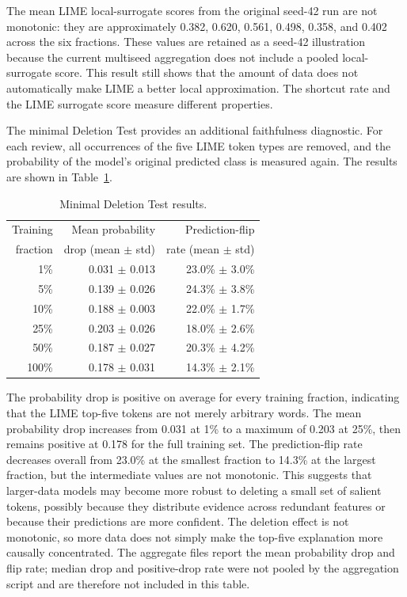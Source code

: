 \documentclass[11pt]{article}
\begin{document}
The mean LIME local-surrogate scores from the original seed-42 run are not monotonic: they are approximately 0.382, 0.620, 0.561, 0.498, 0.358, and 0.402 across the six fractions. These values are retained as a seed-42 illustration because the current multiseed aggregation does not include a pooled local-surrogate score. This result still shows that the amount of data does not automatically make LIME a better local approximation. The shortcut rate and the LIME surrogate score measure different properties.

The minimal Deletion Test provides an additional faithfulness diagnostic. For each review, all occurrences of the five LIME token types are removed, and the probability of the model's original predicted class is measured again. The results are shown in Table~\ref{tab:deletion-results}.

\begin{table}[htbp]
\centering
\small
\caption{Minimal Deletion Test results.}
\label{tab:deletion-results}
\begin{tabular}{rrr}
\toprule
Training & Mean probability & Prediction-flip \\
fraction & drop (mean $\pm$ std) & rate (mean $\pm$ std) \\
\midrule
1\% & 0.031 $\pm$ 0.013 & 23.0\% $\pm$ 3.0\% \\
5\% & 0.139 $\pm$ 0.026 & 24.3\% $\pm$ 3.8\% \\
10\% & 0.188 $\pm$ 0.003 & 22.0\% $\pm$ 1.7\% \\
25\% & 0.203 $\pm$ 0.026 & 18.0\% $\pm$ 2.6\% \\
50\% & 0.187 $\pm$ 0.027 & 20.3\% $\pm$ 4.2\% \\
100\% & 0.178 $\pm$ 0.031 & 14.3\% $\pm$ 2.1\% \\
\bottomrule
\end{tabular}
\end{table}

The probability drop is positive on average for every training fraction, indicating that the LIME top-five tokens are not merely arbitrary words. The mean probability drop increases from 0.031 at 1\% to a maximum of 0.203 at 25\%, then remains positive at 0.178 for the full training set. The prediction-flip rate decreases overall from 23.0\% at the smallest fraction to 14.3\% at the largest fraction, but the intermediate values are not monotonic. This suggests that larger-data models may become more robust to deleting a small set of salient tokens, possibly because they distribute evidence across redundant features or because their predictions are more confident. The deletion effect is not monotonic, so more data does not simply make the top-five explanation more causally concentrated. The aggregate files report the mean probability drop and flip rate; median drop and positive-drop rate were not pooled by the aggregation script and are therefore not included in this table.
\end{document}
